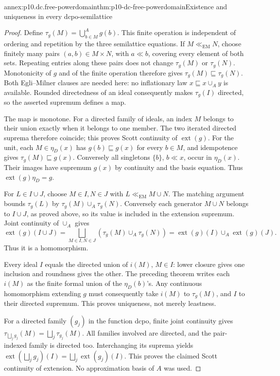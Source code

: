 \begin{annexitem}{annex:p10.dc.free-powerdomain}{thm:p10-dc-free-powerdomain}{Existence and uniqueness in every dcpo-semilattice}
\begin{proof}
Define \(\tau_g(M)=\bigcup_{b\in M}^{A}g(b)\). This finite
operation is independent of ordering and repetition by the three
semilattice equations. If \(M\ll_{\mathrm{EM}}N\), choose finitely
many pairs \((a,b)\in M\times N\), with \(a\ll b\), covering every
element of both sets. Repeating entries along these pairs does not
change \(\tau_g(M)\) or \(\tau_g(N)\). Monotonicity of \(g\) and
of the finite operation therefore gives
\(\tau_g(M)\sqsubseteq\tau_g(N)\). Both Egli--Milner clauses are
needed here: no inflationary law \(x\sqsubseteq x\cup_A y\) is
available. Rounded directedness of an ideal consequently makes
\(\tau_g(I)\) directed, so the asserted supremum defines a map.

The map is monotone. For a directed family of ideals, an index
\(M\) belongs to their union exactly when it belongs to one member.
The two iterated directed suprema therefore coincide; this proves
Scott continuity of \(\operatorname{ext}(g)\).
For the unit, each \(M\in\eta_D(x)\) has \(g(b)\sqsubseteq g(x)\)
for every \(b\in M\), and idempotence gives
\(\tau_g(M)\sqsubseteq g(x)\). Conversely all singletons
\(\{b\}\), \(b\ll x\), occur in \(\eta_D(x)\). Their images
have supremum \(g(x)\) by continuity and the basis equation. Thus
\(\operatorname{ext}(g)\eta_D=g\).

For \(L\in I\cup J\), choose \(M\in I,N\in J\) with
\(L\ll_{\mathrm{EM}}M\cup N\). The matching argument bounds
\(\tau_g(L)\) by \(\tau_g(M)\cup_A\tau_g(N)\).
Conversely each generator \(M\cup N\) belongs to \(I\cup J\),
as proved above, so its value is included in the extension supremum.
Joint continuity of \(\cup_A\) gives
\[
 \operatorname{ext}(g)(I\cup J)
 =\bigsqcup_{M\in I,N\in J}
      (\tau_g(M)\cup_A\tau_g(N))
 =\operatorname{ext}(g)(I)\cup_A\operatorname{ext}(g)(J).
\]
Thus it is a homomorphism.

Every ideal \(I\) equals the directed union of \(i(M)\), \(M\in I\):
lower closure gives one inclusion and roundness gives the other.
The preceding theorem writes each \(i(M)\) as the finite formal
union of the \(\eta_D(b)\)'s. Any continuous homomorphism extending
\(g\) must consequently take \(i(M)\) to \(\tau_g(M)\), and \(I\)
to their directed supremum. This proves uniqueness, not merely leastness.

For a directed family \((g_j)\) in the function dcpo, finite joint
continuity gives \(\tau_{\bigsqcup_jg_j}(M)=\bigsqcup_j\tau_{g_j}(M)\).
All families involved are directed, and the pair-indexed family is
directed too. Interchanging its suprema yields
\(\operatorname{ext}(\bigsqcup_jg_j)(I)=
\bigsqcup_j\operatorname{ext}(g_j)(I)\). This proves the claimed
Scott continuity of extension. No approximation basis of \(A\) was used.
\end{proof}
\end{annexitem}

